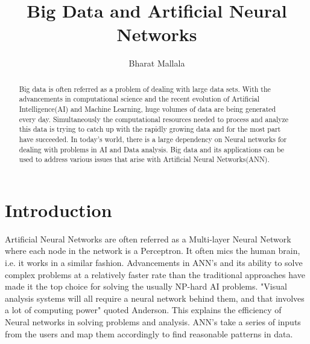 \documentclass[sigconf]{acmart}
\begin{document}
\title{Big Data and Artificial Neural Networks}



\author{Bharat Mallala}


\renewcommand{\shortauthors}{B. Trovato et al.}


\begin{abstract}
Big data is often referred as a problem of dealing with large data sets. With the advancements in computational science and the recent evolution of Artificial Intelligence(AI) and Machine Learning, huge volumes of data are being generated every day. Simultaneously the computational resources needed to process and analyze this data is trying to catch up with the rapidly growing data and for the most part have succeeded. In today's world, there is a large dependency on Neural networks for dealing with problems in AI and Data analysis. Big data and its applications can be used to address various issues that arise with Artificial Neural Networks(ANN). 
\end{abstract}



\maketitle

\section{Introduction}

Artificial Neural Networks are often referred as a Multi-layer Neural Network where each node in the network is a Perceptron. It often mics the human brain, i.e. it works in a similar fashion. Advancements in ANN's and its ability to solve complex problems at a relatively faster rate than the traditional approaches have made it the top choice for solving the usually NP-hard AI problems. "Visual analysis systems will all require a neural network behind them, and that involves a lot of computing power"\cite{Anderson2017} quoted Anderson. This explains the efficiency of Neural networks in solving problems and analysis. ANN's take a series of inputs from the users and map them accordingly to find reasonable patterns in data.
\end{document}
